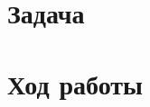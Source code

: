 \documentclass[a4paper,12pt]{article}
\begin{document}
	\section{Задача}
	\section{Ход работы}
	
\end{document}
